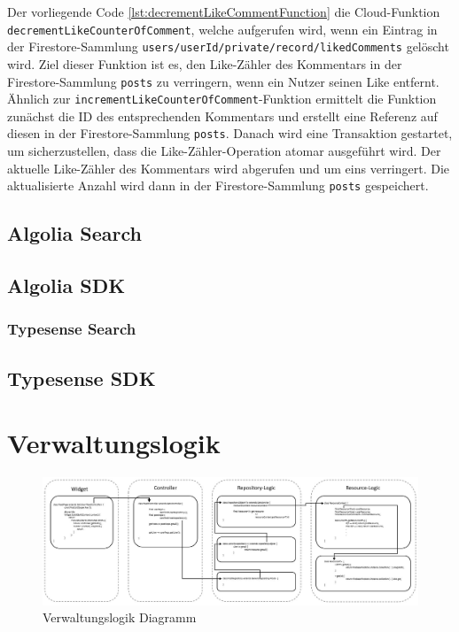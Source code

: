Der vorliegende Code \ref{lst:decrementLikeCommentFunction} die Cloud-Funktion \texttt{decrementLikeCounterOfComment}, welche aufgerufen wird, wenn ein Eintrag in der Firestore-Sammlung \texttt{users/{userId}/private/record/likedComments} gelöscht wird. Ziel dieser Funktion ist es, den Like-Zähler des Kommentars in der Firestore-Sammlung \texttt{posts} zu verringern, wenn ein Nutzer seinen Like entfernt. Ähnlich zur \texttt{incrementLikeCounterOfComment}-Funktion ermittelt die Funktion zunächst die ID des entsprechenden Kommentars und erstellt eine Referenz auf diesen in der Firestore-Sammlung \texttt{posts}. Danach wird eine Transaktion gestartet, um sicherzustellen, dass die Like-Zähler-Operation atomar ausgeführt wird. Der aktuelle Like-Zähler des Kommentars wird abgerufen und um eins verringert. Die aktualisierte Anzahl wird dann in der Firestore-Sammlung \texttt{posts} gespeichert.

\subsection{Algolia Search}
\subsection{Algolia SDK}

\subsubsection{Typesense Search}
\subsection{Typesense SDK}

\section{Verwaltungslogik}

\begin{figure}[h]
  \centering
  \includegraphics[width=1\textwidth]{pics/Management-Logic.JPG}
  \caption{Verwaltungslogik Diagramm}
  \label{fig:management-logic-diagram}
\end{figure}

